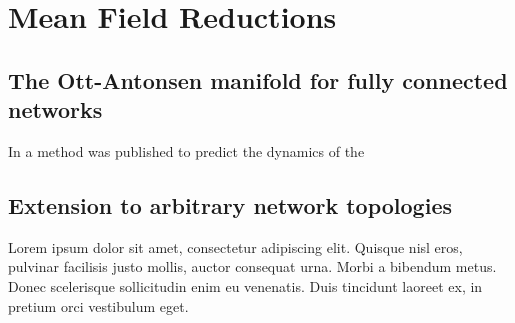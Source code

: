 \newpage
\section{Mean Field Reductions}
\subsection{The Ott-Antonsen manifold for fully connected networks}
In \cite{OttAntonsen2008, OttAntonsen2009, OttAntonsen2010} a method was published to predict the dynamics of the 

\subsection{Extension to arbitrary network topologies}
Lorem ipsum dolor sit amet, consectetur adipiscing elit. Quisque nisl eros, 
pulvinar facilisis justo mollis, auctor consequat urna. Morbi a bibendum metus. 
Donec scelerisque sollicitudin enim eu venenatis. Duis tincidunt laoreet ex, 
in pretium orci vestibulum eget.
